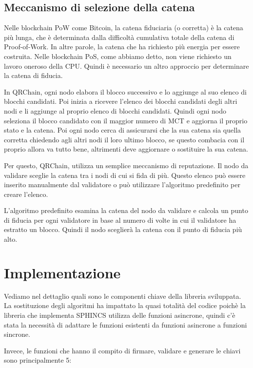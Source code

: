 \subsection{Meccanismo di selezione della catena}
Nelle blockchain PoW come Bitcoin, la catena fiduciaria (o corretta) è la catena più lunga, che è determinata dalla difficoltà cumulativa totale della catena di Proof-of-Work. In altre parole, la catena che ha richiesto più energia per essere costruita.
Nelle blockchain PoS, come abbiamo detto, non viene richiesto un lavoro oneroso della CPU. Quindi è necessario un altro approccio per determinare la catena di fiducia.

In QRChain, ogni nodo elabora il blocco successivo e lo aggiunge al suo elenco di blocchi candidati. Poi inizia a ricevere l'elenco dei blocchi candidati degli altri nodi e li aggiunge al proprio elenco di blocchi candidati.
Quindi ogni nodo seleziona il blocco candidato con il maggior numero di MCT e aggiorna il proprio stato e la catena.
Poi ogni nodo cerca di assicurarsi che la sua catena sia quella corretta chiedendo agli altri nodi il loro ultimo blocco, se questo combacia con il proprio allora va tutto bene, altrimenti deve aggiornare o sostituire la sua catena.

Per questo, QRChain, utilizza un semplice meccanismo di reputazione. Il nodo da validare sceglie la catena tra i nodi di cui si fida di più. Questo elenco può essere inserito manualmente dal validatore o può utilizzare l'algoritmo predefinito per creare l'elenco.

L'algoritmo predefinito esamina la catena del nodo da validare e calcola un punto di fiducia per ogni validatore in base al numero di volte in cui il validatore ha estratto un blocco.
Quindi il nodo sceglierà la catena con il punto di fiducia più alto.

\section{Implementazione}
Vediamo nel dettaglio quali sono le componenti chiave della libreria sviluppata. La sostituzione degli algoritmi ha impattato la quasi totalità del codice poichè la libreria che implementa SPHINCS utilizza delle funzioni asincrone, quindi c'è stata la necessità di adattare le funzioni esistenti da funzioni asincrone a funzioni sincrone.

Invece, le funzioni che hanno il compito di firmare, validare e generare le chiavi sono principalmente 5:

